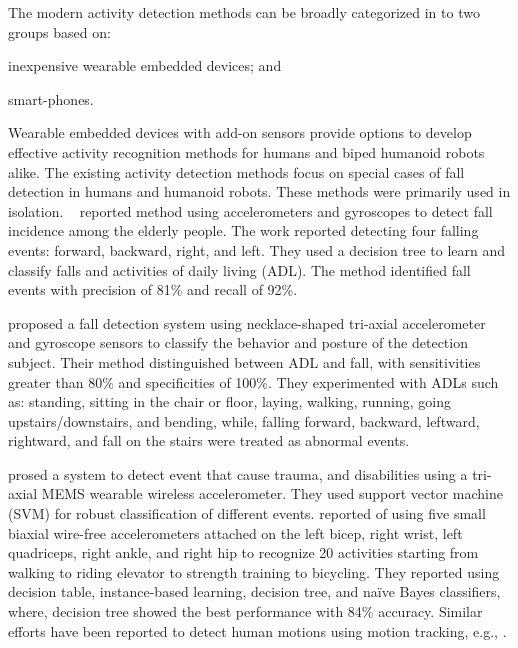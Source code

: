 \documentclass[letterpaper]{article}
\begin{document}
\begin{sloppy}
The modern activity detection methods can be broadly categorized in to two groups based on: 
\begin{inparaenum}[1)] \item inexpensive wearable embedded devices; and \item smart-phones. 
\end{inparaenum} Wearable embedded devices with add-on sensors provide options to develop effective 
activity recognition methods for humans and biped humanoid robots alike. The existing activity 
detection methods focus on special cases of fall detection in humans and humanoid robots. These 
methods were primarily used in isolation.  {~\cite{ojetola2011fall}} reported method using 
accelerometers and gyroscopes to detect fall incidence among the elderly people. The work reported 
detecting four falling events: forward, backward, right, and left.  They used a decision tree to 
learn and classify falls and activities of daily living (ADL). The method identified fall events 
with precision of 81\%  and recall of 92\%. 

\cite{baek2013real} proposed  a fall  detection  system  using necklace-shaped tri-axial
accelerometer  and  gyroscope  sensors  to  classify  the  behavior  and  posture  of  the detection
 subject. Their method distinguished between  ADL and  fall, with  sensitivities  greater  than 
 80\%  and specificities  of  100\%. They experimented with ADLs such as: standing, sitting in the 
 chair or floor, laying, walking, running, going upstairs/downstairs, and bending, while, 
 falling forward, backward, leftward, rightward, and fall on the stairs were treated as abnormal 
 events. 
 
\cite{leone2013supervised} prosed a system to detect event that cause trauma, and disabilities
using a tri-axial MEMS wearable wireless accelerometer. They used support vector machine (SVM) for
robust classification of different events. \cite{Bao04activityrecognition} reported of using five 
small biaxial wire-free accelerometers attached  on the left bicep, right wrist, left quadriceps, 
right ankle, and right hip to recognize 20 activities starting from  walking  to  riding elevator  
to  strength  training to bicycling. They reported using decision table, instance-based learning, 
decision tree, and na\"{i}ve Bayes classifiers, where, decision tree showed the best performance 
with 84\% accuracy.  Similar efforts have been reported to detect human motions using motion 
tracking, e.g., \cite{dumitrache2013fall,kumarwearable,liang2012pre}. 



\end{sloppy}
\end{document}
